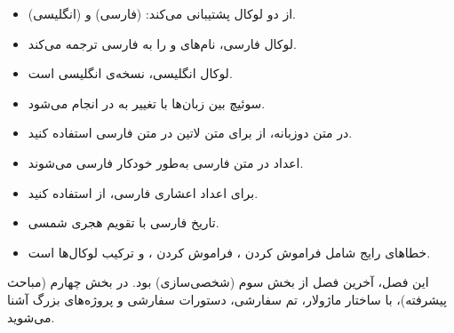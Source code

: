 \begin{itemize}
    \item {} از دو لوکال پشتیبانی
    می‌کند:  (فارسی) و 
    (انگلیسی).

    \item لوکال فارسی، نام‌های  و
     را به فارسی ترجمه می‌کند.

    \item لوکال انگلیسی، نسخه‌ی انگلیسی
     است.

    \item سوئیچ بین زبان‌ها با تغییر
     به
     در
     انجام می‌شود.

    \item در متن دوزبانه، از  برای
    متن لاتین در متن فارسی استفاده کنید.

    \item اعداد در متن فارسی به‌طور خودکار
    فارسی می‌شوند.

    \item برای اعداد اعشاری فارسی، از
     استفاده کنید.

    \item تاریخ فارسی با تقویم هجری شمسی.

    \item خطاهای رایج شامل فراموش کردن
    ، فراموش کردن ، و
    ترکیب لوکال‌ها است.
\end{itemize}

این فصل، آخرین فصل از بخش سوم (شخصی‌سازی)
بود. در بخش چهارم (مباحث پیشرفته)، با
ساختار ماژولار، تم سفارشی، دستورات سفارشی
و پروژه‌های بزرگ آشنا می‌شوید.